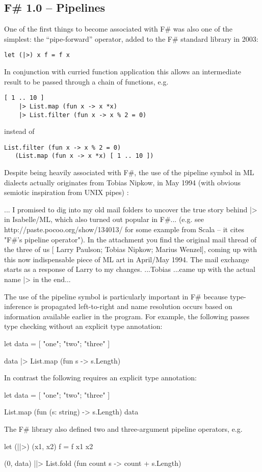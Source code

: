 \documentclass[acmsmall,review]{acmart}\settopmatter{printfolios=true,printccs=false,printacmref=false}
\begin{document}
\subsection*{F\# 1.0 – Pipelines}

One of the first things to become associated with F\# was also one of the simplest: the “pipe-forward” operator, added to the F\# standard library in 2003:
\begin{verbatim}
let (|>) x f = f x
\end{verbatim}
In conjunction with curried function application this allows an intermediate result to be passed through a chain of functions, e.g.
\begin{verbatim}
[ 1 .. 10 ] 
    |> List.map (fun x -> x *x) 
    |> List.filter (fun x -> x % 2 = 0)
\end{verbatim}
instead of 
\begin{verbatim}
List.filter (fun x -> x % 2 = 0) 
   (List.map (fun x -> x *x) [ 1 .. 10 ])
\end{verbatim}
Despite being heavily associated with F\#, the use of the pipeline symbol in ML dialects actually originates from Tobias Nipkow, in May 1994 (with obvious semiotic inspiration from UNIX pipes) :
\begin{verbquote}
... I promised to dig into my old mail folders to uncover the true story behind |> in Isabelle/ML, which also turned out popular in F\#... (e.g. see http://paste.pocoo.org/show/134013/ for some example from Scala -- it cites "F\#'s pipeline operator"). 
In the attachment you find the original mail thread of the three of us [ Larry Paulson; Tobias Nipkow; Marius Wenzel], coming up with this now indispensable piece of ML art in April/May 1994. The mail exchange starts as a response of Larry to my changes.  
...Tobias ...came up with the actual name |> in the end...
\end{verbquote}
The use of the pipeline symbol is particularly important in F\# because type-inference is propagated left-to-right and name resolution occurs based on information available earlier in the program.  For example, the following passes type checking without an explicit type annotation:
\begin{verbquote}
let data = [ "one"; "two"; "three" ] 

data |> List.map (fun s -> s.Length)
\end{verbquote}
In contrast the following requires an explicit type annotation:
\begin{verbquote}
let data = [ "one"; "two"; "three" ] 

List.map (fun (s: string) -> s.Length) data
\end{verbquote}
The F\# library also defined two and three-argument pipeline operators, e.g.
\begin{verbquote}
let (||>) (x1, x2) f = f x1 x2

(0, data) 
    ||> List.fold (fun count s -> count + s.Length)
\end{verbquote}
\end{document}
